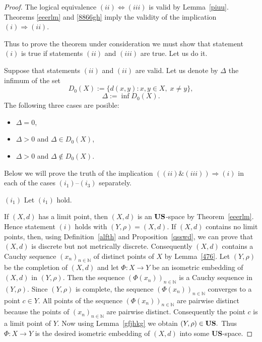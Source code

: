 \documentclass[11pt]{article}
\theoremstyle{definition}
\theoremstyle{remark}
\numberwithin{equation}{section}
\begin{document}
\begin{proof}


The logical equivalence $(ii) \Leftrightarrow (iii)$ is valid by Lemma~\ref{piuu}.  
Theorems \ref{eeerlm} and \ref{8866gh} imply the validity of the implication $(i) \Rightarrow (ii)$.  

Thus to prove the theorem under consideration we must show that statement $(i)$ is true if statements $(ii)$ and $(iii)$ are true.  
Let us do it.  


Suppose that statements $(ii)$ and $(ii)$ are valid.  Let us denote by $\Delta$ the infimum of the set 
\begin{equation}
    \label{ety1}
    D_0(X) := \{ d(x,y) : x,y \in X, \; x \neq y \}, 
\end{equation}
\begin{equation}
\label{ety2}
    \Delta:=\inf D_0(X).
\end{equation}
The following three cases are posible:
\begin{itemize}[left=10pt]
    \item[$(i_1)$] $\Delta=0$,

       \item[$(i_2)$] $\Delta>0$ and $\Delta \in D_0(X)$,

   \item[$(i_3)$] $\Delta>0$ and $\Delta \notin D_0(X)$.
    
\end{itemize}

Below we will prove the truth of the implication $((ii)\&(iii))\Rightarrow (i)$ in each of the cases $(i_1)$--$(i_3)$ separately.


$(i_1)$ Let $(i_1)$ hold.

If $(X,d)$ has a limit point, then $(X,d)$ is an $\bf US$-space by Theorem~\ref{eeerlm}. Hence statement $(i)$ holds with 
\((Y,\rho) = (X,d)\). If \((X,d)\) contains no limit points, then, using 
Definition~\ref{alfth} and Proposition~\ref{qsswd}, 
we can prove that \((X,d)\) is discrete 
but not metrically discrete.
Consequently $(X,d)$ contains a Cauchy sequence $(x_{n})_{n\in\mathbb{N}}$ of distinct points of $X$ by Lemma~\ref{476}.  
Let $(Y,\rho)$ be the completion of  $(X,d)$ and let $\Phi\colon X\to Y$ be an isometric embedding of $(X,d)$ in $(Y,\rho)$.  
Then the sequence $(\Phi(x_{n}))_{n\in\mathbb{N}}$ is a Cauchy sequence in $(Y,\rho)$.  
Since $(Y,\rho)$ is complete, the sequence $(\Phi(x_{n}))_{n\in\mathbb{N}}$ converges to a point $c\in Y$.  All points of the sequence $(\Phi(x_{n}))_{n\in\mathbb{N}}$  are pairwise distinct because the points of 
$(x_{n})_{n\in\mathbb{N}}$ are pairwise distinct.
Consequently the point $c$ is a limit point of $Y$.  Now using Lemma~\ref{gfjhkg} we obtain 
$
(Y,\rho)\in {\bf US}.
$
Thus  $\Phi:X\to Y$ is the desired isometric embedding of $(X,d)$ into some {\bf US}-space.




\end{proof}
\end{document}
